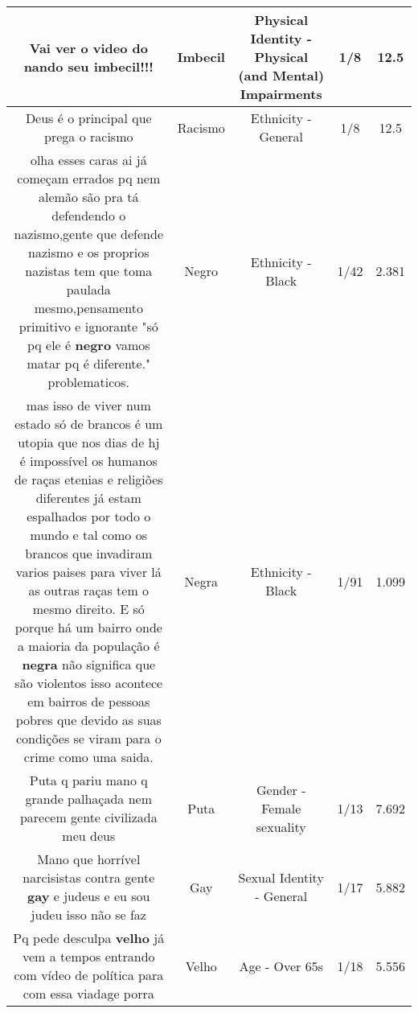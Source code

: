 \documentclass[11pt]{article}
\newlength\mylength
\begin{document}
\begin{center}
\begin{longtable}{|C{.65\mylength}|C{.30\mylength}|C{.12\mylength}|C{.12\mylength}|C{.12\mylength}|}
  \small Vai ver o video do nando seu \textbf{imbecil}!!!\normalsize   & Imbecil & Physical Identity - Physical (and Mental) Impairments & 1/8 & 12.5 \\  \hline
  \small Deus é o principal que prega o racismo\normalsize   & Racismo & Ethnicity - General & 1/8 & 12.5 \\  \hline
  \small olha esses caras ai já começam errados pq nem alemão são pra tá defendendo o nazismo,gente que defende nazismo e os proprios nazistas tem que toma paulada mesmo,pensamento primitivo e ignorante "só pq ele é \textbf{negro} vamos matar pq é diferente." problematicos.\normalsize   & Negro & Ethnicity - Black & 1/42 & 2.381 \\  \hline
  \small mas isso de viver num estado só de brancos é um utopia que nos dias de hj é impossível os humanos de raças etenias e religiões diferentes já estam espalhados por todo o mundo e tal como os brancos que invadiram varios paises para viver lá as outras raças tem o mesmo direito. E só porque há um bairro onde a maioria da população é \textbf{negra} não significa que são violentos isso acontece em bairros de pessoas pobres que devido as suas condições se viram para o crime como uma saida.\normalsize   & Negra & Ethnicity - Black & 1/91 & 1.099 \\  \hline
  \small Puta q pariu mano q grande palhaçada nem parecem gente civilizada meu deus\normalsize   & Puta & Gender - Female sexuality & 1/13 & 7.692 \\  \hline
  \small Mano que horrível narcisistas contra gente \textbf{gay} e judeus e eu sou judeu isso não se faz\normalsize   & Gay & Sexual Identity - General & 1/17 & 5.882 \\  \hline
  \small Pq pede desculpa \textbf{velho} já vem a tempos entrando com vídeo de política para com essa viadage porra\normalsize   & Velho & Age - Over 65s & 1/18 & 5.556 \\  \hline

\end{longtable}
\end{center}
\end{document}
